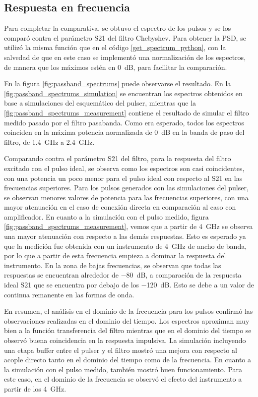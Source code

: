 \subsection{Respuesta en frecuencia}

Para completar la comparativa, se obtuvo el espectro de los pulsos y se los
comparó contra el parámetro S21 del filtro Chebyshev. Para obtener la PSD, se
utilizó la misma función que en el código \ref{get_spectrum_python}, con la
salvedad de que en este caso se implementó una normalización de los espectros,
de manera que los máximos estén en \qty{0}{\dB}, para facilitar la comparación.

En la figura \ref{fig:passband_spectrums} puede observarse el resultado. En la
\ref{fig:passband_spectrums_simulation} se encuentran los espectros obtenidos en
base a simulaciones del esquemático del pulser, mientras que la
\ref{fig:passband_spectrums_measurement} contiene el resultado de simular el
filtro medido pasado por el filtro pasabanda. Como era esperado, todos los
espectros coinciden en la máxima potencia normalizada de \qty{0}{\dB} en la
banda de paso del filtro, de \qty{1.4}{\giga\hertz} a \qty{2.4}{\giga\hertz}.

Comparando contra el parámetro S21 del filtro, para la respuesta del filtro
excitado con el pulso ideal, se observa como los espectros son casi
coincidentes, con una potencia un poco menor para el pulso ideal con respecto al
S21 en las frecuencias superiores. Para los pulsos generados con las
simulaciones del pulser, se observan menores valores de potencia para las
frecuencias superiores, con una mayor atenuación en el caso de conexión directa
en comparación al caso con amplificador. En cuanto a la simulación con el pulso
medido, figura \ref{fig:passband_spectrums_measurement}, vemos que a
partir de \qty{4}{\giga\hertz} se observa una mayor atenuación con respecto a
las demás respuestas. Esto es esperado ya que la medición fue obtenida con un
instrumento de \qty{4}{\giga\hertz} de ancho de banda, por lo que a partir de
esta frecuencia empieza a dominar la respuesta del instrumento. En la zona de
bajas frecuencias, se observan que todas las respuestas se encuentran alrededor
de \qty{-80}{\dB}, a comparación de la respuesta ideal S21 que se encuentra por
debajo de los \qty{-120}{\dB}. Esto se debe a un valor de continua remanente en
las formas de onda.

En resumen, el análisis en el dominio de la frecuencia para los pulsos confirmó
las observaciones realizadas en el dominio del tiempo. Los espectros aproximan
muy bien a la función transferencia del filtro mientras que en el dominio
del tiempo se observó buena coincidencia en la respuesta impulsiva. La
simulación incluyendo una etapa buffer entre el pulser y el filtro mostró una
mejora con respecto al acople directo tanto en el dominio del tiempo como de la
frecuencia. En cuanto a la simulación con el pulso medido, también mostró buen
funcionamiento. Para este caso, en el dominio de la frecuencia se observó el
efecto del instrumento a partir de los \qty{4}{\giga\hertz}.

